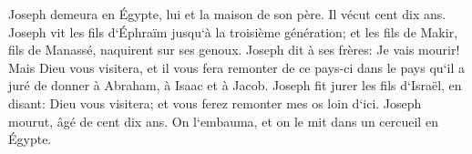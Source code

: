 \verse Joseph demeura en Égypte, lui et la maison de son père. Il vécut cent dix ans. 
\verse Joseph vit les fils d`Éphraïm jusqu`à la troisième génération; et les fils de Makir, fils de Manassé, naquirent sur ses genoux. 
\verse Joseph dit à ses frères: Je vais mourir! Mais Dieu vous visitera, et il vous fera remonter de ce pays-ci dans le pays qu`il a juré de donner à Abraham, à Isaac et à Jacob. 
\verse Joseph fit jurer les fils d`Israël, en disant: Dieu vous visitera; et vous ferez remonter mes os loin d`ici. 
\verse Joseph mourut, âgé de cent dix ans. On l`embauma, et on le mit dans un cercueil en Égypte. 
